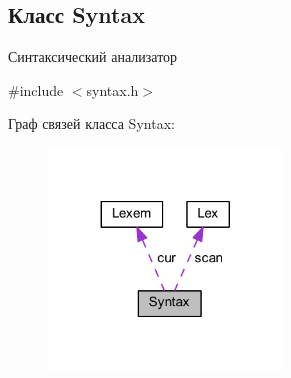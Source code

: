 \hypertarget{class_syntax}{}\subsection{Класс Syntax}
\label{class_syntax}


Синтаксический анализатор  




{\ttfamily \#include $<$syntax.\+h$>$}



Граф связей класса Syntax\+:
\nopagebreak
\begin{figure}[H]
\begin{center}
\leavevmode
\includegraphics[width=176pt]{class_syntax__coll__graph}
\end{center}
\end{figure}
